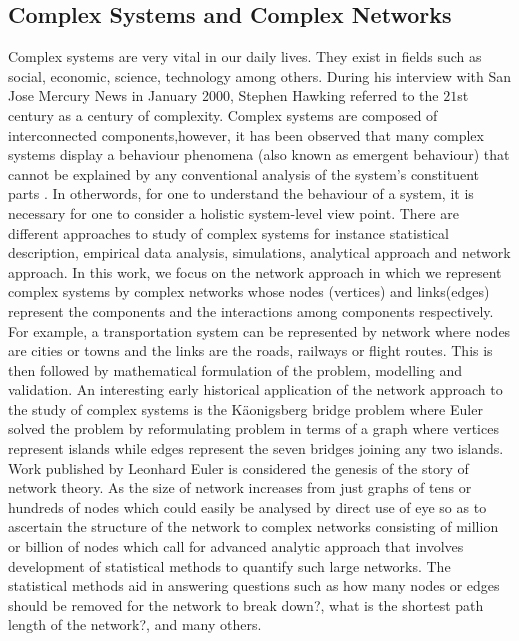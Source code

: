 \documentclass[10pt,a4paper]{article}
\begin{document}
\subsection{Complex Systems and Complex Networks}
Complex systems are very vital in our daily lives. They exist in fields such as social, economic, science, technology among others.  During his interview with San Jose Mercury News in January 2000, Stephen Hawking referred to the $21$st century as a century of complexity. Complex systems are composed of interconnected components,however, it has been observed that many complex systems display a behaviour phenomena (also known as emergent behaviour) that cannot be explained by any conventional analysis of the system's constituent parts \citep{EncyBrit}. In otherwords, for one to understand the behaviour of a system, it is necessary for one to consider a holistic system-level view point.  There are different approaches to study of complex systems for instance statistical description, empirical data analysis, simulations, analytical approach and network approach. In this work, we focus on the network approach in which we represent complex systems by complex networks whose nodes (vertices) and links(edges) represent the components and the interactions among components respectively.  For example, a transportation system can be represented by network where nodes are cities or towns and the links are the roads, railways or flight routes. This is then followed by mathematical formulation of the problem, modelling and validation.  
An interesting early historical application of the network approach to the study of complex systems is the K\"{a}onigsberg bridge problem where Euler \citep{euler1976solution,euler1953leonhard} solved the problem by reformulating problem in terms of a graph where vertices represent islands while edges represent the seven bridges joining any two islands. Work published by Leonhard Euler \citep{euler1976solution} is considered the genesis of the story of network theory.
As the size of network increases from just graphs of tens or hundreds of nodes which could easily be analysed by direct use of eye so as to ascertain the structure of the network  to complex networks consisting of million or billion of nodes which call for advanced analytic approach that involves development of statistical methods to quantify such large networks. The statistical methods aid in answering questions such as how many nodes or edges should be removed for the network to break down?, what is the shortest path length of the network?, and many others. 
\end{document}
